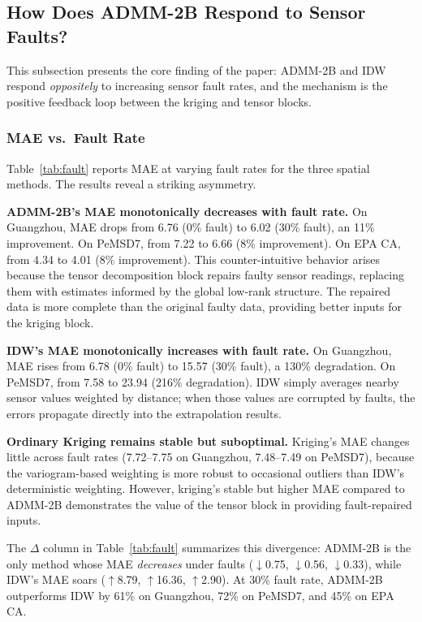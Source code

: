 \documentclass[journal]{IEEEtran}
\begin{document}
\subsection{How Does ADMM-2B Respond to Sensor Faults?}\label{sec:results_q3}

This subsection presents the core finding of the paper: ADMM-2B and IDW respond \emph{oppositely} to increasing sensor fault rates, and the mechanism is the positive feedback loop between the kriging and tensor blocks.

\subsubsection{MAE vs.\ Fault Rate}

Table~\ref{tab:fault} reports MAE at varying fault rates for the three spatial methods. The results reveal a striking asymmetry.

\textbf{ADMM-2B's MAE monotonically decreases with fault rate.}
On Guangzhou, MAE drops from 6.76 (0\% fault) to 6.02 (30\% fault), an 11\% improvement. On PeMSD7, from 7.22 to 6.66 (8\% improvement). On EPA CA, from 4.34 to 4.01 (8\% improvement). This counter-intuitive behavior arises because the tensor decomposition block repairs faulty sensor readings, replacing them with estimates informed by the global low-rank structure. The repaired data is more complete than the original faulty data, providing better inputs for the kriging block.

\textbf{IDW's MAE monotonically increases with fault rate.}
On Guangzhou, MAE rises from 6.78 (0\% fault) to 15.57 (30\% fault), a 130\% degradation. On PeMSD7, from 7.58 to 23.94 (216\% degradation). IDW simply averages nearby sensor values weighted by distance; when those values are corrupted by faults, the errors propagate directly into the extrapolation results.

\textbf{Ordinary Kriging remains stable but suboptimal.}
Kriging's MAE changes little across fault rates (7.72--7.75 on Guangzhou, 7.48--7.49 on PeMSD7), because the variogram-based weighting is more robust to occasional outliers than IDW's deterministic weighting. However, kriging's stable but higher MAE compared to ADMM-2B demonstrates the value of the tensor block in providing fault-repaired inputs.

The $\Delta$ column in Table~\ref{tab:fault} summarizes this divergence: ADMM-2B is the only method whose MAE \emph{decreases} under faults ($\downarrow$0.75, $\downarrow$0.56, $\downarrow$0.33), while IDW's MAE soars ($\uparrow$8.79, $\uparrow$16.36, $\uparrow$2.90). At 30\% fault rate, ADMM-2B outperforms IDW by 61\% on Guangzhou, 72\% on PeMSD7, and 45\% on EPA CA.
\end{document}
